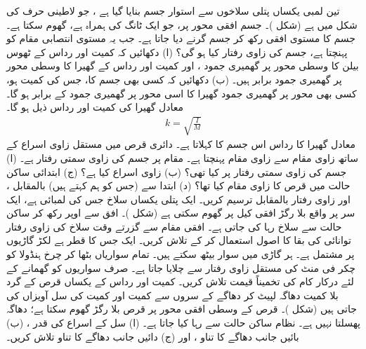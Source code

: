 تین  لمبی  یکساں پتلی سلاخوں سے استوار جسم بنایا گیا ہے ، جو لاطینی حرف  کی شکل میں ہے (شکل )۔ جسم   افقی محور پر، جو ایک ٹانگ     کی  ہمراہ ہے،  گھوم سکتا ہے۔ جسم کا مستوی افقی رکھ کر جسم  گرنے دیا جاتا ہے۔ جب یہ مستوی انتصابی مقام کو پہنچتا ہے، جسم کی زاوی رفتار کیا ہو گی؟
(ا) دکھائیں کہ   کمیت  اور رداس    کے ٹھوس بیلن کا وسطی  محور پر گھمیری جمود ، اور   کمیت  اور رداس   کے  گھیرا  کا وسطی محور پر گھمیری جمود برابر ہیں۔ (ب)  دکھائیں کہ  کسی بھی جسم کا، جس کی کمیت  ہو، کسی بھی محور پر   گھمیری جمود    گھیرا  کا اسی محور پر  گھمیری جمود  کے برابر ہو گا۔ معادل گھیرا کی کمیت  اور رداس  ذیل ہو گا۔
\begin{align*}
k=\sqrt{\frac{I}{M}}
\end{align*}
معادل گھیرا  کا رداس  اس جسم کا کہلاتا ہے۔
دائری قرص  میں مستقل زاوی اسراع کے ساتھ زاوی مقام  سے زاوی مقام  پہنچتا ہے۔ مقام  پر جسم کی زاوی سمتی رفتار  ہے۔ (ا)  جسم کی زاوی سمتی  رفتار  پر کیا تھی؟ (ب)  زاوی اسراع کیا ہے؟ (ج) ابتدائی ساکن حالت میں قرص کا زاوی مقام کیا تھا؟ (د)   ابتدا  سے (جس کو ہم   کہتے ہیں)    بالمقابل ، اور زاوی رفتار  بالمقابل  ترسیم کریں۔
ایک پتلی یکساں سلاخ جس کی لمبائی  ہے، ایک سر پر واقع بلا رگڑ  افقی کیل پر گھوم سکتی ہے (شکل )۔ افق سے  اوپر رکھ کر   ساکن حالت سے  سلاخ  رہا کی جاتی ہے۔ افقی مقام سے گزرتے وقت سلاخ کی زاوی رفتار  توانائی کی بقا کا اصول  استعمال کر کے تلاش کریں۔
ایک   جس کا قطر  ہے  لکڑ گاڑیوں پر مشتمل ہے۔ ہر گاڑی میں  سوار بیٹھ سکتے ہیں۔ تمام  سواریاں  بٹھا کر  چرخ ہنڈولا  کو  چکر فی   منٹ  کی مستقل زاوی رفتار سے چلایا جاتا ہے۔ صرف سواریوں  کو گھمانے کے لئے  درکار کام کی تخمیناً قیمت تلاش کریں۔
کمیت  اور رداس  کے یکساں قرص کے گرد بلا کمیت  دھاگہ  لپیٹ کر دھاگے کے سروں سے    کمیت اور  کمیت  کی  سل  آویزاں کی   جاتی ہیں (شکل )۔ قرص کے وسطی افقی محور پر قرص بلا رگڑ گھوم سکتا ہے؛ دھاگہ پھسلتا نہیں ہے۔ نظام ساکن حالت سے رہا کیا جاتا ہے۔ (ا)  سل کے اسراع کی قدر ، (ب)  بائیں جانب دھاگے کا تناو ، اور (ج) دائیں جانب دھاگے کا تناو  تلاش کریں۔
